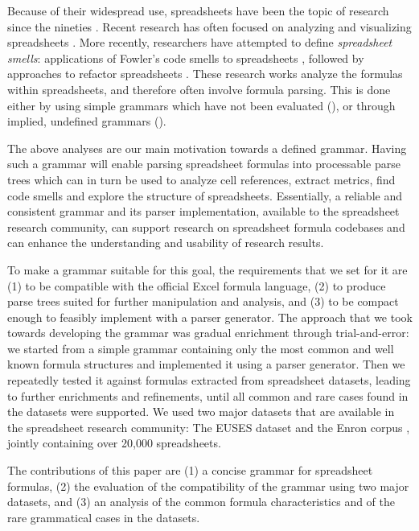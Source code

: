 \documentclass[conference]{IEEEtran}
\begin{document}
Because of their widespread use, spreadsheets have been the topic of research since the nineties \cite{DBLP:journals/sigplan/BellP93}. Recent research has often focused on analyzing and visualizing spreadsheets \cite{DBLP:conf/icse/HermansPD11, Shio1999}. More recently, researchers have attempted to define \emph{spreadsheet smells}: applications of Fowler's code smells to spreadsheets \cite{DBLP:conf/icse/HermansPD12, DBLP:conf/icsm/Hermans212}, followed by approaches to refactor spreadsheets \cite{hermans2014bumblebee,badame2012refactoring}. These research works analyze the formulas within spreadsheets, and therefore often involve formula parsing. This is done either by using simple grammars which have not been evaluated (\cite{badame2012refactoring}), or through implied, undefined grammars (\cite{DBLP:conf/icse/HermansPD11,DBLP:conf/icse/HermansPD12, DBLP:conf/icsm/Hermans212, hermans2014bumblebee}). 

The above analyses are our main motivation towards a defined grammar. Having such a grammar will enable parsing spreadsheet formulas into processable parse trees which can in turn be used to analyze cell references, extract metrics, find code smells and explore the structure of spreadsheets. Essentially, a reliable and consistent grammar and its parser implementation, available to the spreadsheet research community, can support research on spreadsheet formula codebases and can enhance the understanding and usability of research results.

To make a grammar suitable for this goal, the requirements that we set for it are (1) to be compatible with the official Excel formula language, (2) to produce parse trees suited for further manipulation and analysis, and (3) to be compact enough to feasibly implement with a parser generator. The approach that we took towards developing the grammar was gradual enrichment through trial-and-error: we started from a simple grammar containing only the most common and well known formula structures and implemented it using a parser generator. Then we repeatedly tested it against formulas extracted from spreadsheet datasets, leading to further enrichments and refinements, until all common and rare cases found in the datasets were supported.
We used two major datasets that are available in the spreadsheet research community: The EUSES dataset \cite{euses} and the Enron corpus \cite{enron}, jointly containing over 20,000 spreadsheets. 

The contributions of this paper are (1) a concise grammar for spreadsheet formulas, (2) the evaluation of the compatibility of the grammar using two major datasets, and (3) an analysis of the common formula characteristics and of the rare grammatical cases in the datasets.
\end{document}
